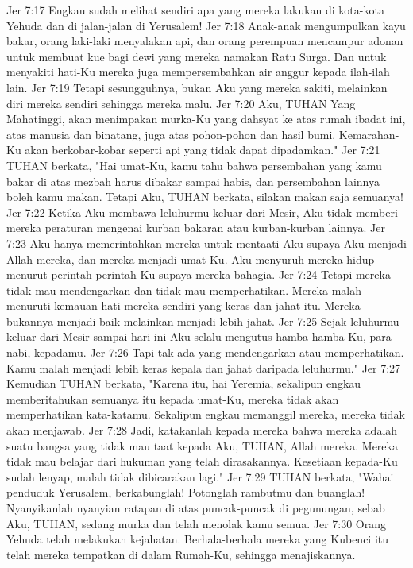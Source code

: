Jer 7:17  Engkau sudah melihat sendiri apa yang mereka lakukan di kota-kota Yehuda dan di jalan-jalan di Yerusalem!
Jer 7:18  Anak-anak mengumpulkan kayu bakar, orang laki-laki menyalakan api, dan orang perempuan mencampur adonan untuk membuat kue bagi dewi yang mereka namakan Ratu Surga. Dan untuk menyakiti hati-Ku mereka juga mempersembahkan air anggur kepada ilah-ilah lain.
Jer 7:19  Tetapi sesungguhnya, bukan Aku yang mereka sakiti, melainkan diri mereka sendiri sehingga mereka malu.
Jer 7:20  Aku, TUHAN Yang Mahatinggi, akan menimpakan murka-Ku yang dahsyat ke atas rumah ibadat ini, atas manusia dan binatang, juga atas pohon-pohon dan hasil bumi. Kemarahan-Ku akan berkobar-kobar seperti api yang tidak dapat dipadamkan."
Jer 7:21  TUHAN berkata, "Hai umat-Ku, kamu tahu bahwa persembahan yang kamu bakar di atas mezbah harus dibakar sampai habis, dan persembahan lainnya boleh kamu makan. Tetapi Aku, TUHAN berkata, silakan makan saja semuanya!
Jer 7:22  Ketika Aku membawa leluhurmu keluar dari Mesir, Aku tidak memberi mereka peraturan mengenai kurban bakaran atau kurban-kurban lainnya.
Jer 7:23  Aku hanya memerintahkan mereka untuk mentaati Aku supaya Aku menjadi Allah mereka, dan mereka menjadi umat-Ku. Aku menyuruh mereka hidup menurut perintah-perintah-Ku supaya mereka bahagia.
Jer 7:24  Tetapi mereka tidak mau mendengarkan dan tidak mau memperhatikan. Mereka malah menuruti kemauan hati mereka sendiri yang keras dan jahat itu. Mereka bukannya menjadi baik melainkan menjadi lebih jahat.
Jer 7:25  Sejak leluhurmu keluar dari Mesir sampai hari ini Aku selalu mengutus hamba-hamba-Ku, para nabi, kepadamu.
Jer 7:26  Tapi tak ada yang mendengarkan atau memperhatikan. Kamu malah menjadi lebih keras kepala dan jahat daripada leluhurmu."
Jer 7:27  Kemudian TUHAN berkata, "Karena itu, hai Yeremia, sekalipun engkau memberitahukan semuanya itu kepada umat-Ku, mereka tidak akan memperhatikan kata-katamu. Sekalipun engkau memanggil mereka, mereka tidak akan menjawab.
Jer 7:28  Jadi, katakanlah kepada mereka bahwa mereka adalah suatu bangsa yang tidak mau taat kepada Aku, TUHAN, Allah mereka. Mereka tidak mau belajar dari hukuman yang telah dirasakannya. Kesetiaan kepada-Ku sudah lenyap, malah tidak dibicarakan lagi."
Jer 7:29  TUHAN berkata, "Wahai penduduk Yerusalem, berkabunglah! Potonglah rambutmu dan buanglah! Nyanyikanlah nyanyian ratapan di atas puncak-puncak di pegunungan, sebab Aku, TUHAN, sedang murka dan telah menolak kamu semua.
Jer 7:30  Orang Yehuda telah melakukan kejahatan. Berhala-berhala mereka yang Kubenci itu telah mereka tempatkan di dalam Rumah-Ku, sehingga menajiskannya.
